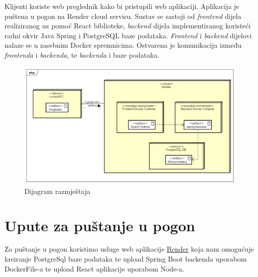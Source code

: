 			{Klijenti koriste web preglednik kako bi pristupili web aplikaciji. Aplikacija je puštena u pogon na Render cloud servisu. Sustav se sastoji od \textit{frontend} dijela realiziranog uz pomoć React biblioteke, \textit{backend} dijela implementiranog koristeći radni okvir Java Spring i PostgreSQL baze podataka. \textit{Frontend} i \textit{backend} dijelovi nalaze se u zasebnim Docker spremnicima. Ostvarena je komunikacija između \textit{frontenda} i \textit{backenda}, te \textit{backenda} i baze podataka.}
	\begin{figure}[H]
		\includegraphics[scale= 0.45]{slike/Deployment Diagram0.png}
		\centering
		\caption{Dijagram razmještaja}
		\label{fig:Dijagram razmještaja}
	\end{figure} 
			
			\eject 
		
		\section{Upute za puštanje u pogon}
			
			 \noindent Za puštanje u pogon koristimo usluge web aplikacije \href{www.render.com}{Render} koja nam omogućuje kreiranje PostgreSql baze podataka te upload Spring Boot backenda uporabom DockerFile-a te upload React aplikacije uporabom Node-a.\newline
			 
